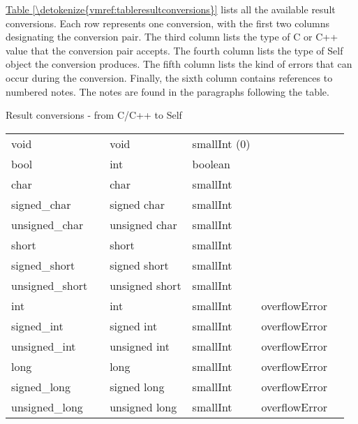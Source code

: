 \documentclass[letterpaper,10pt,english]{sphinxmanual}
\begin{document}
\hyperref[\detokenize{vmref:tableresultconversions}]{Table \ref{\detokenize{vmref:tableresultconversions}}} lists all the available result conversions. Each row represents one conversion, with the first
two columns designating the conversion pair. The third column lists the type of C or C++ value that
the conversion pair accepts. The fourth column lists the type of Self object the conversion produces.
The fifth column lists the kind of errors that can occur during the conversion. Finally, the sixth
column contains references to numbered notes. The notes are found in the paragraphs following
the table.


\begin{threeparttable}
\capstart\caption{Result conversions - from C/C++ to Self}\label{\detokenize{vmref:tableresultconversions}}\label{\detokenize{vmref:id13}}
\noindent\begin{tabulary}{\linewidth}{p{2cm} p{2cm} p{2cm} p{2cm} p{2cm} p{2cm}}
\hline
{}\relax &\relax &\relax &\relax &\relax &\relax \\
\hline
void
&&
void
&
smallInt (0)
&&\\
\hline
bool
&&
int
&
boolean
&&\\
\hline
char
&&
char
&
smallInt
&&\\
\hline
signed\_char
&&
signed char
&
smallInt
&&\\
\hline
unsigned\_char
&&
unsigned char
&
smallInt
&&\\
\hline
short
&&
short
&
smallInt
&&\\
\hline
signed\_short
&&
signed short
&
smallInt
&&\\
\hline
unsigned\_short
&&
unsigned short
&
smallInt
&&\\
\hline
int
&&
int
&
smallInt
&
overflowError
&\\
\hline
signed\_int
&&
signed int
&
smallInt
&
overflowError
&\\
\hline
unsigned\_int
&&
unsigned int
&
smallInt
&
overflowError
&\\
\hline
long
&&
long
&
smallInt
&
overflowError
&\\
\hline
signed\_long
&&
signed long
&
smallInt
&
overflowError
&\\
\hline
unsigned\_long
&&
unsigned long
&
smallInt
&
overflowError
&\\

\end{tabulary}
\end{threeparttable}
\end{document}
